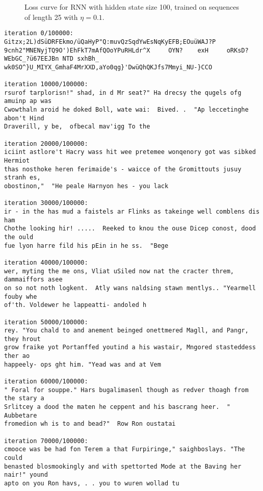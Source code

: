\documentclass{article}
\begin{document}
\begin{figure}
  \centering
  
  \caption{Loss curve for RNN with hidden state size 100, trained on sequences
           of length 25 with $\eta = 0.1$.}
  \label{fig:loss}
\end{figure}

\begin{listing}
\scriptsize
\begin{verbatim}
iteration 0/100000:
Gitzx;2L)dSüDRFEkmo/üQaHyP"Q:muvQzSqdYwEsNqKyEFB;EOuüWAJ?P
9cnh2"MNENyjTQ9O')EhFkT7mAfQOoYPuRHLdr^X     OYN?    exH     oRKsD?
WEbGC_?ü67EEJBn NTD sxhBh_
wk0SO^}U_MIYX_GmhaF4MrXXD,aYo0qg}'DwüQhQKJfs7Mmyi_NU-}CCO

iteration 10000/100000:
rsurof tarplorisn!" shad, in d Mr seat?" Ha drecsy the qugels ofg amuinp ap was
Cwowthaln aroid he doked Boll, wate wai:  Bived. .  "Ap leccetinghe abon't Hind
Draverill, y be,  ofbecal mav'igg To the

iteration 20000/100000:
iciint astlore't Hacry wass hit wee pretemee wonqenory got was sibked Hermiot
thas nosthoke heren ferimaide's - waicce of the Gromittouts jusuy stranh es,
obostinon,"  "He peale Harnyon hes - you lack

iteration 30000/100000:
ir - in the has mud a faistels ar Flinks as takeinge well comblens dis ham
Chothe looking hir! .....  Reeked to knou the ouse Dicep conost, dood the ould
fue lyon harre fild his pEin in he ss.  "Bege

iteration 40000/100000:
wer, myting the me ons, Vliat uSiled now nat the cracter threm, dammaiffors asee
on so not noth logkent.  Atly wans naldsing stawn mentlys.. "Yearmell fouby whe
of'th. Voldewer he lappeatti- andoled h

iteration 50000/100000:
rey. "You chald to and anement beinged onettmered Magll, and Pangr, they hrout
grow fraike yot Portanffed youtind a his wastair, Mngored stasteddess ther ao
happeely- ops ght him. "Yead was and at Vem

iteration 60000/100000:
" Foral for souppe." Hars bugalimasenl though as redver thoagh from the stary a
Srlitcey a dood the maten he ceppent and his bascrang heer.  "       Aubbetare
fromedion wh is to and bead?"  Row Ron oustatai

iteration 70000/100000:
cmooce was be had fon Terem a that Furpiringe," saighboslays. "The could
benasted blosmookingly and with spettorted Mode at the Baving her nair!" yound
apto on you Ron havs, . . you to wuren wollad tu


\end{verbatim}
\end{listing}
\end{document}
